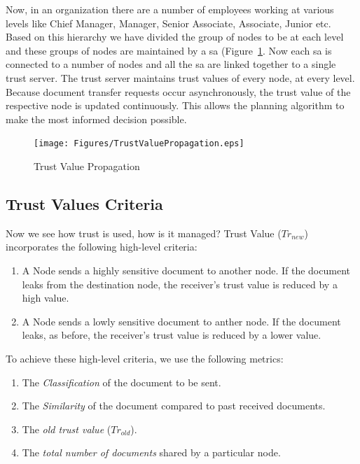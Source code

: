 Now, in an organization there are a number of employees working at various levels like
Chief Manager, Manager, Senior Associate, Associate, Junior etc. Based on this hierarchy we
have divided the group of nodes to be at each level and these groups of nodes are maintained
by a \gls{sa} (Figure~\ref{fig:TrustTransmission}. Now each \gls{sa} is connected to a number of nodes and all
the \Gls{sa} are linked together to a single trust server. The trust server
maintains trust values of every node, at every level. Because document transfer
requests occur asynchronously, the trust value of the respective node is updated
continuously. This allows the planning algorithm to
make the most informed decision possible. 



\begin{figure}[h!]
    \begin{center}
        \texttt{[image: Figures/TrustValuePropagation.eps]}
        \caption{Trust Value Propagation}
        \label{fig:TrustTransmission}
    \end{center}
\end{figure}
\FloatBarrier

\subsection{Trust Values Criteria}
\label{sec:trust_value_criteria}
Now we see how trust is used, how is it managed?
Trust Value (\(Tr_{new}\)) incorporates the following high-level
criteria:
\begin{enumerate}
    \item A Node sends a highly sensitive document to another node. If the document leaks from
        the destination node, the receiver's trust value is reduced by a high value.
    \item A Node sends a lowly sensitive document to anther node. If the document leaks, as
        before, the receiver's trust value is reduced by a lower value.
\end{enumerate}

To achieve these high-level criteria, we use the following metrics:
\begin{enumerate}
    \item The \emph{Classification} of the document to be sent.
    \item The \emph{Similarity} of the document compared to past received
        documents.
    \item The \emph{old trust value} (\(Tr_{old}\)).
    \item The \emph{total number of documents} shared by a particular node.
\end{enumerate}

